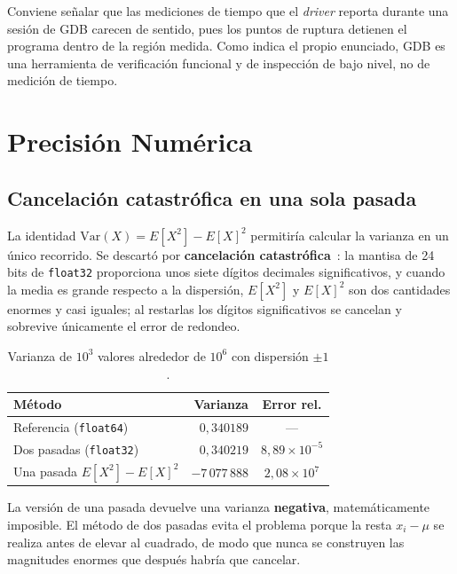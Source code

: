 \documentclass[journal]{IEEEtran}
\begin{document}
Conviene señalar que las mediciones de tiempo que el \textit{driver}
reporta durante una sesión de GDB carecen de sentido, pues los puntos de
ruptura detienen el programa dentro de la región medida. Como indica el
propio enunciado, GDB es una herramienta de verificación funcional y de
inspección de bajo nivel, no de medición de tiempo.

\section{Precisión Numérica}
\label{sec:precision}

\subsection{Cancelación catastrófica en una sola pasada}
\label{sec:cancelacion}

La identidad $\mathrm{Var}(X) = E[X^2] - E[X]^2$ permitiría calcular la
varianza en un único recorrido. Se descartó por \textbf{cancelación
catastrófica}~\cite{goldberg1991}: la mantisa de 24 bits de
\texttt{float32} proporciona unos siete dígitos decimales significativos,
y cuando la media es grande respecto a la dispersión, $E[X^2]$ y
$E[X]^2$ son dos cantidades enormes y casi iguales; al restarlas los
dígitos significativos se cancelan y sobrevive únicamente el error de
redondeo.

\begin{table}[ht]
\centering
\caption{Varianza de $10^3$ valores alrededor de $10^6$ con dispersión
  $\pm 1$.}
\label{tab:cancelacion}
\footnotesize
\begin{tabular}{|l|r|c|}
\hline
\textbf{Método} & \textbf{Varianza} & \textbf{Error rel.} \\ \hline
Referencia (\texttt{float64})  & $0,340189$    & --- \\ \hline
Dos pasadas (\texttt{float32}) & $0,340219$    & $8,89\times10^{-5}$ \\ \hline
Una pasada $E[X^2]-E[X]^2$     & $-7\,077\,888$  & $2,08\times10^{7}$ \\ \hline
\end{tabular}
\end{table}

La versión de una pasada devuelve una varianza \textbf{negativa},
matemáticamente imposible. El método de dos pasadas evita el problema
porque la resta $x_i - \mu$ se realiza antes de elevar al cuadrado, de
modo que nunca se construyen las magnitudes enormes que después
habría que cancelar.
\end{document}
